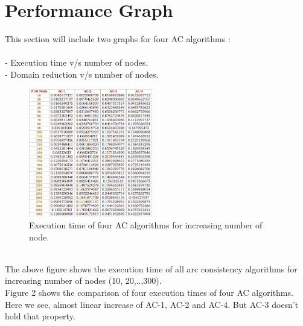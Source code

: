 \documentclass[12pt,twocolumn,letterpaper]{article}
\begin{document}
\section*{Performance Graph}
This section will include two graphs for four AC algorithms :\\\\
- Execution time v/s number of nodes. \\
- Domain reduction v/s number of nodes. \\
\begin{figure}[h]

\includegraphics[width=0.48\textwidth]{ac_timeStat}

\caption{\scriptsize Execution time of four AC algorithms for increasing number of node.}
\end{figure}
\\
The above figure shows the execution time of all arc consistency algorithms for increasing number of nodes (10, 20,..,300).\\

Figure 2 shows the comparison of four execution times of four AC algorithms. Here we see, almost linear increase of AC-1, AC-2 and AC-4. But AC-3 doesn't hold that property.
\end{document}
